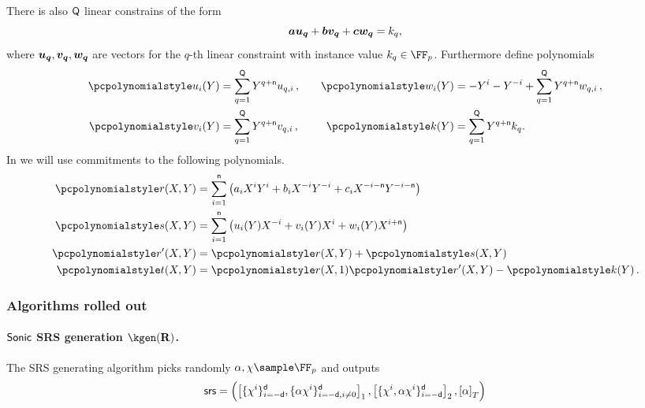 \documentclass[runningheads,11pt]{llncs}
\def\vec#1{\mathchoice{\mbox{\boldmath$\displaystyle#1$}}
{\mbox{\boldmath$\textstyle#1$}} {\mbox{\boldmath$\scriptstyle#1$}}
{\mbox{\boldmath$\scriptscriptstyle#1$}}}
\theoremstyle{definition} \newtheorem{definition}[theorem]{Definition}
\begin{document}
There is also $\mathsf{Q}$ linear constrains of the form
\[
  \va \vec{u_q} + \vb \vec{v_q} + \vc \vec{w_q} = k_q,
\]
where $\vec{u_q}, \vec{v_q}, \vec{w_q}$ are vectors for the $q$-th linear
constraint with instance value $k_q \in \FF_p$. Furthermore define polynomials
\begin{equation}
  \begin{split}
    \p{u_i}(Y) & = \sum_{q = 1}^\linconstr Y^{q + \multconstr} u_{q, i}\,,\\
    \p{v_i}(Y) & = \sum_{q = 1}^\linconstr Y^{q + \multconstr} v_{q, i}\,,\\
  \end{split}
  \qquad
  \begin{split}
    \p{w_i}(Y) & = -Y^i - Y^{-i} + \sum_{q = 1}^\linconstr Y^{q +
      \multconstr} w_{q, i}\,,\\
    \p{k}(Y) & = \sum_{q = 1}^\linconstr Y^{q + \multconstr} k_{q}.
  \end{split}
\end{equation}
In \sonic{} we will use commitments to the following polynomials.
\begin{align*}
  \pr(X, Y) & = \sum_{i = 1}^{\multconstr} \left(a_i X^i Y^i + b_i X^{-i} Y^{-i}
              + c_i X^{-i - \multconstr} Y^{-i - \multconstr}\right) \\
  \p{s}(X, Y) & = \sum_{i = 1}^{\multconstr} \left( u_i (Y) X^{-i} +
                v_i(Y) X^i + w_i(Y) X^{i + \multconstr}\right)\\
  \pr'(X, Y) & = \pr(X, Y) + \p{s}(X, Y) \\
  \pt(X, Y) & = \pr(X, 1) \pr'(X, Y) - \p{k}(Y)\,.
\end{align*}
	
\subsubsection{Algorithms rolled out}
\paragraph{${\textnormal{\textsf{Sonic}}}$ SRS generation $\kgen(\REL)$.} The SRS generating algorithm picks
randomly $\alpha, \chi \sample \FF_p$ and outputs
	\[
      \mathsf{srs} = \left( \left[\{\chi^i\}_{i = -\mathsf{d}}^{\mathsf{d}},
          \{\alpha \chi^i\}_{i = -\mathsf{d}, i \neq 0}^{\mathsf{d}}\right]_{1},
        \left[\{\chi^i, \alpha \chi^i\}_{i = - \mathsf{d}}^{\mathsf{d}}\right]_{2},
        \left[\alpha\right]_{T} \right)
	\]
\end{document}
